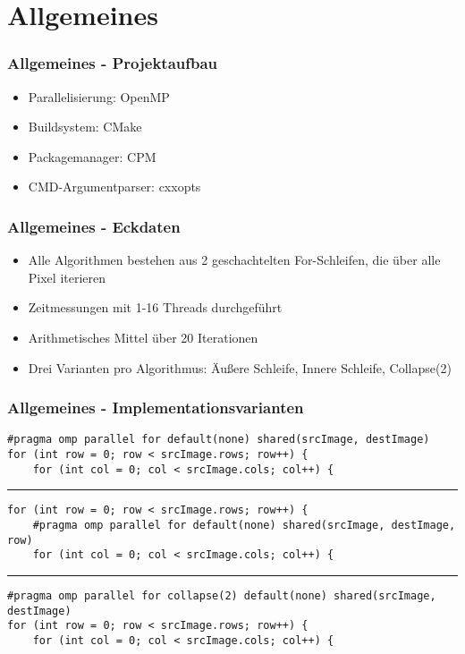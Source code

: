 \section {Allgemeines}


\begin{frame}
    \frametitle{Allgemeines - Projektaufbau}

    \begin{itemize}
        \item Parallelisierung: OpenMP \pause
        \item Buildsystem: CMake \pause
        \item Packagemanager: CPM \pause
        \item CMD-Argumentparser: cxxopts
    \end{itemize}

\end{frame}

\begin{frame}
    \frametitle{Allgemeines - Eckdaten}

    \begin{itemize}
        \item Alle Algorithmen bestehen aus 2 geschachtelten For-Schleifen, die über alle Pixel iterieren \pause
        \item Zeitmessungen mit 1-16 Threads durchgeführt \pause
        \item Arithmetisches Mittel über 20 Iterationen \pause
        \item Drei Varianten pro Algorithmus: Äußere Schleife, Innere Schleife, Collapse(2)
    \end{itemize}
\end{frame}

\begin{frame}[fragile]
    \frametitle{Allgemeines - Implementationsvarianten}


    \begin{verbatim}
#pragma omp parallel for default(none) shared(srcImage, destImage)
for (int row = 0; row < srcImage.rows; row++) {
    for (int col = 0; col < srcImage.cols; col++) {
    \end{verbatim}
    \pause

    \hrule

    \begin{verbatim}
for (int row = 0; row < srcImage.rows; row++) {
    #pragma omp parallel for default(none) shared(srcImage, destImage, row)
    for (int col = 0; col < srcImage.cols; col++) {
    \end{verbatim}
    \pause

    \hrule

    \begin{verbatim}
#pragma omp parallel for collapse(2) default(none) shared(srcImage, destImage)
for (int row = 0; row < srcImage.rows; row++) {
    for (int col = 0; col < srcImage.cols; col++) {
    \end{verbatim}

    
\end{frame}